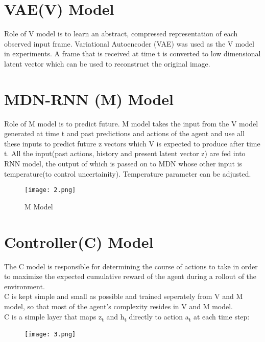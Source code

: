\documentclass{article}
\begin{document}
\section{VAE(V) Model}
Role of V model is to learn an abstract, compressed representation of each observed input frame. Variational Autoencoder (VAE) was used as the V model in experiments. A frame that is received at time t is converted to low dimensional latent vector which can be used to reconstruct the original image.

\section{MDN-RNN (M) Model}
Role of M model is to predict future. M model takes the input from the V model generated at time t and past predictions and actions of the agent and use all these inputs to predict future z vectors which V is expected to produce after time t. All the input(past actions, history and present latent vector z) are fed into RNN model, the output of which is passed on to MDN whose other input is temperature(to control uncertainity). Temperature parameter can be adjusted.
\begin{figure}[H]
  \texttt{[image: 2.png]}
  \caption{M Model}
\end{figure}

\section{Controller(C) Model}
The C model is responsible for determining the course of actions to take in order to maximize the expected cumulative reward of the agent during a rollout of the environment.\\
C is kept simple and small as possible and trained seperately from V and M model, so that most of the agent's complexity resides in V and M model.\\
C is a simple layer that maps z\textsubscript{t} and h\textsubscript{t} directly to action a\textsubscript{t} at each time step:
\begin{figure}[H]
  \texttt{[image: 3.png]}
\end{figure}
\end{document}
